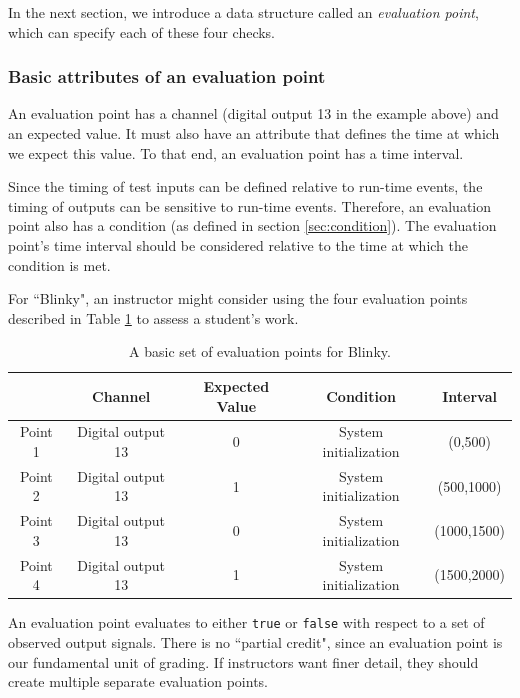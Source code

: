 \documentclass[12pt]{article}
\begin{document}
In the next section, we introduce a data structure called an \textit{evaluation point}, which can specify each of these four checks.

\subsubsection{Basic attributes of an evaluation point}
An evaluation point has a channel (digital output 13 in the example above) and an expected value.  It must also have an attribute that defines the time at which we expect this value.  To that end, an evaluation point has a time interval.

Since the timing of test inputs can be defined relative to run-time events, the timing of outputs can be sensitive to run-time events.  Therefore, an evaluation point also has a condition (as defined in section \ref{sec:condition}).  The evaluation point's time interval should be considered relative to the time at which the condition is met.

For ``Blinky", an instructor might consider using the four evaluation points described in Table \ref{table:blinky-basic-points} to assess a student's work.

\begin{table}[ht]
\begin{center}
\caption{A basic set of evaluation points for Blinky.}
\vspace{2mm}
\label{table:blinky-basic-points}
\begin{tabular}{c|cccc}
& Channel & Expected Value & Condition & Interval \\ \hline
Point 1 & Digital output 13 & 0 & System initialization & (0,500) \\
Point 2 & Digital output 13 & 1 & System initialization & (500,1000) \\
Point 3 & Digital output 13 & 0 & System initialization & (1000,1500) \\
Point 4 & Digital output 13 & 1 & System initialization & (1500,2000) \\ \hline
\end{tabular}
\end{center}
\end{table}

An evaluation point evaluates to either \texttt{true} or \texttt{false} with respect to a set of observed output signals.  There is no ``partial credit", since an evaluation point is our fundamental unit of grading.  If instructors want finer detail, they should create multiple separate evaluation points. 
\end{document}
